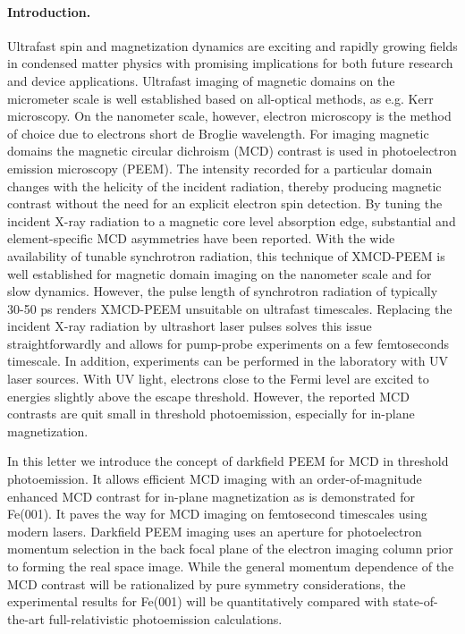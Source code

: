 \documentclass[prl,twocolumn,floatfix]{revtex4-2}
\begin{document}
\paragraph{Introduction.} Ultrafast spin and magnetization dynamics are exciting and rapidly growing fields in condensed matter physics with promising implications for both future research and device applications. Ultrafast imaging of magnetic domains on the micrometer scale is well established based on all-optical methods, as e.g. Kerr microscopy. On the nanometer scale, however, electron microscopy is the method of choice due to electrons short de Broglie wavelength. 
For imaging magnetic domains the magnetic circular dichroism (MCD) contrast is used in photoelectron emission microscopy (PEEM). The intensity recorded for a particular domain changes with the helicity of the incident radiation, thereby producing magnetic contrast without the need for an explicit electron spin detection. By tuning the incident X-ray radiation to a magnetic core level absorption edge, substantial and element-specific MCD asymmetries have been reported. With the wide availability of tunable synchrotron radiation, this technique of XMCD-PEEM is well established for magnetic domain imaging on the nanometer scale and for slow dynamics. However, the pulse length of synchrotron radiation of typically 30-50 ps renders XMCD-PEEM unsuitable on ultrafast timescales. 
Replacing the incident X-ray radiation by ultrashort laser pulses solves this issue straightforwardly and allows for pump-probe experiments on a few femtoseconds timescale. In addition, experiments can be performed in the laboratory with UV laser sources. 
With UV light, electrons close to the Fermi level are excited to energies slightly above the escape threshold. However, the reported MCD contrasts are quit small in threshold photoemission, especially for in-plane magnetization. 


In this letter we introduce the concept of darkfield PEEM for MCD in threshold photoemission. It allows efficient MCD imaging with an order-of-magnitude enhanced MCD contrast for in-plane magnetization as is demonstrated for Fe(001). It paves the way for MCD imaging on femtosecond timescales using modern lasers.
Darkfield PEEM imaging uses an aperture for photoelectron momentum selection in the back focal plane of the electron imaging column prior to forming the real space image. While the general momentum dependence of the MCD contrast will be rationalized by pure symmetry considerations, the experimental results for Fe(001) will be quantitatively compared with state-of-the-art full-relativistic photoemission calculations.
\end{document}
